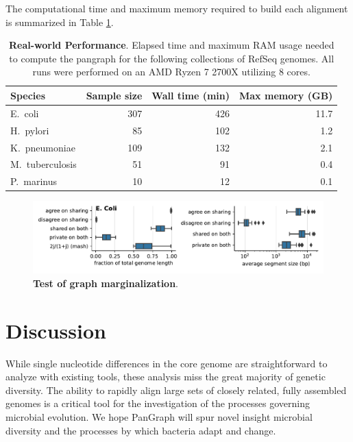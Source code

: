 \documentclass[aps,rmp,reprint,superscriptaddress,notitlepage,10pt]{revtex4-1}
\begin{document}
The computational time and maximum memory required to build each alignment is summarized in Table \ref{table:panx-performance}.

\begin{table}[hb]
    \caption{{\bf Real-world Performance}.
        Elapsed time and maximum RAM usage needed to compute the pangraph for the following collections of RefSeq genomes.
        All runs were performed on an AMD Ryzen 7 2700X utilizing 8 cores.
    }
    \begin{tabular}{l r r r }
        \hline\hline
        Species         & Sample size & Wall time (min) & Max memory (GB) \\
        \hline
        E.~coli         & 307         & 426             & 11.7            \\
        H.~pylori       & 85          & 102             & 1.2             \\
        K.~pneumoniae   & 109         & 132             & 2.1             \\
        M.~tuberculosis & 51          & 91              & 0.4             \\
        P.~marinus      & 10          & 12              & 0.1             \\
        \hline
    \end{tabular}
    \label{table:panx-performance}
\end{table}

\begin{figure}[htb]
    \includegraphics[width=.8\textwidth]{figs/proj_single_escherichia_coli.pdf}
    \caption{{\bf Test of graph marginalization}.}
    \label{fig:marginalization}
\end{figure}

\section{Discussion}
While single nucleotide differences in the core genome are straightforward to analyze with existing tools, these analysis miss the great majority of genetic diversity.
The ability to rapidly align large sets of closely related, fully assembled genomes is a critical tool for the investigation of the processes governing microbial evolution.
We hope PanGraph will spur novel insight microbial diversity and the processes by which bacteria adapt and change.
\end{document}
